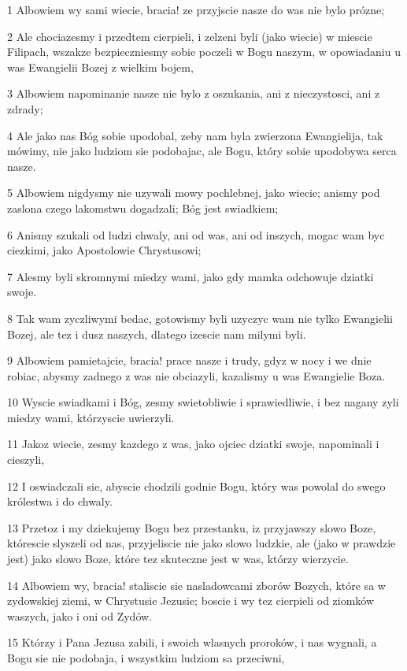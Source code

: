 \par 1 Albowiem wy sami wiecie, bracia! ze przyjscie nasze do was nie bylo prózne;
\par 2 Ale chociazesmy i przedtem cierpieli, i zelzeni byli (jako wiecie) w miescie Filipach, wszakze bezpieczniesmy sobie poczeli w Bogu naszym, w opowiadaniu u was Ewangielii Bozej z wielkim bojem,
\par 3 Albowiem napominanie nasze nie bylo z oszukania, ani z nieczystosci, ani z zdrady;
\par 4 Ale jako nas Bóg sobie upodobal, zeby nam byla zwierzona Ewangielija, tak mówimy, nie jako ludziom sie podobajac, ale Bogu, który sobie upodobywa serca nasze.
\par 5 Albowiem nigdysmy nie uzywali mowy pochlebnej, jako wiecie; anismy pod zaslona czego lakomstwu dogadzali; Bóg jest swiadkiem;
\par 6 Anismy szukali od ludzi chwaly, ani od was, ani od inszych, mogac wam byc ciezkimi, jako Apostolowie Chrystusowi;
\par 7 Alesmy byli skromnymi miedzy wami, jako gdy mamka odchowuje dziatki swoje.
\par 8 Tak wam zyczliwymi bedac, gotowismy byli uzyczyc wam nie tylko Ewangielii Bozej, ale tez i dusz naszych, dlatego izescie nam milymi byli.
\par 9 Albowiem pamietajcie, bracia! prace nasze i trudy, gdyz w nocy i we dnie robiac, abysmy zadnego z was nie obciazyli, kazalismy u was Ewangielie Boza.
\par 10 Wyscie swiadkami i Bóg, zesmy swietobliwie i sprawiedliwie, i bez nagany zyli miedzy wami, którzyscie uwierzyli.
\par 11 Jakoz wiecie, zesmy kazdego z was, jako ojciec dziatki swoje, napominali i cieszyli,
\par 12 I oswiadczali sie, abyscie chodzili godnie Bogu, który was powolal do swego królestwa i do chwaly.
\par 13 Przetoz i my dziekujemy Bogu bez przestanku, iz przyjawszy slowo Boze, którescie slyszeli od nas, przyjeliscie nie jako slowo ludzkie, ale (jako w prawdzie jest) jako slowo Boze, które tez skuteczne jest w was, którzy wierzycie.
\par 14 Albowiem wy, bracia! staliscie sie nasladowcami zborów Bozych, które sa w zydowskiej ziemi, w Chrystusie Jezusie; boscie i wy tez cierpieli od ziomków waszych, jako i oni od Zydów.
\par 15 Którzy i Pana Jezusa zabili, i swoich wlasnych proroków, i nas wygnali, a Bogu sie nie podobaja, i wszystkim ludziom sa przeciwni,
